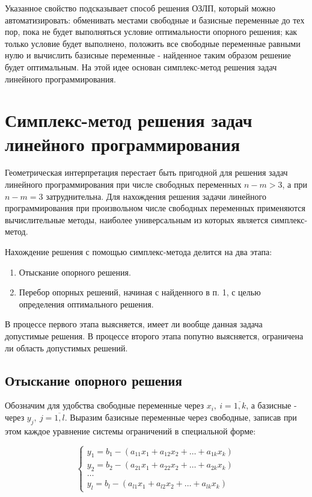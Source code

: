 \documentclass[a4paper,12pt]{report}
\begin{document}
Указанное свойство подсказывает способ решения ОЗЛП, который можно автоматизировать: обменивать местами свободные и базисные переменные до тех пор, пока не будет выполняться условие оптимальности опорного решения; как только условие будет выполнено, положить все свободные переменные равными нулю и вычислить базисные переменные - найденное таким образом решение будет оптимальным. На этой идее основан симплекс-метод решения задач линейного программирования.

\section{Симплекс-метод решения задач линейного программирования}
Геометрическая интерпретация перестает быть пригодной для решения задач линейного программирования при числе свободных переменных $n - m > 3$, а при $n - m = 3$ затруднительна. Для нахождения решения задачи линейного программирования при произвольном числе свободных переменных применяются вычислительные методы, наиболее универсальным из которых является симплекс-метод.

Нахождение решения с помощью симплекс-метода делится на два этапа:
\begin{enumerate}
\item Отыскание опорного решения.
\item Перебор опорных решений, начиная с найденного в п. 1, с целью определения оптимального решения.
\end{enumerate}

В процессе первого этапа выясняется, имеет ли вообще данная задача допустимые решения. В процессе второго этапа попутно выясняется, ограничена ли область допустимых решений.

\subsection{Отыскание опорного решения}
\label{sec:search_op_sol}
Обозначим для удобства свободные переменные через $x_{i},\ i=\overline{1,k}$, а базисные - через $y_{j},\ j=\overline{1,l}$. Выразим базисные переменные через свободные, записав при этом каждое уравнение системы ограничений в специальной форме:

\begin{equation}
\label{eq:num24}
\begin{cases}
y_{1} = b_{1} - (a_{11}x_{1} + a_{12}x_{2} + \ldots + a_{1k}x_{k})\\
y_{2} = b_{2} - (a_{21}x_{1} + a_{22}x_{2} + \ldots + a_{2k}x_{k})\\
\ldots \\
y_{l} = b_{l} - (a_{l1}x_{1} + a_{l2}x_{2} + \ldots + a_{lk}x_{k})
\end{cases}	
\end{equation}
\end{document}
